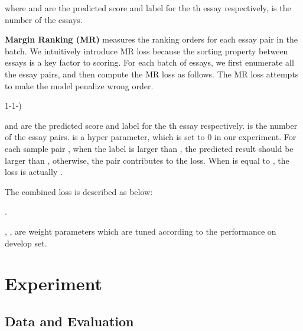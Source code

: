 \documentclass[11pt]{article}
\begin{document}
where  and  are the predicted score and label for the th essay respectively,  is the number of the essays.

\textbf{Margin Ranking (MR)} measures the ranking orders for each essay pair in the batch.
We intuitively introduce MR loss because the sorting property between essays is a key factor to scoring.
For each batch of essays, we first enumerate all the essay pairs, and then compute the MR loss as follows.
The MR loss attempts to make the model penalize wrong order.
\begin{center}

1-1-)
\end{center}
 and  are the predicted score and label for the th essay respectively.
 is the number of the essay pairs.
 is a hyper parameter, which is set to 0 in our experiment.
For each sample pair ,  when the label  is larger than , the predicted result  should be larger than , otherwise, the pair contributes  to the loss. When  is equal to , the loss is actually .

The combined loss is described as below:

. 

, ,  are weight parameters which are tuned according to the performance on develop set.

\section{Experiment}

\subsection{Data and Evaluation}
\end{document}
